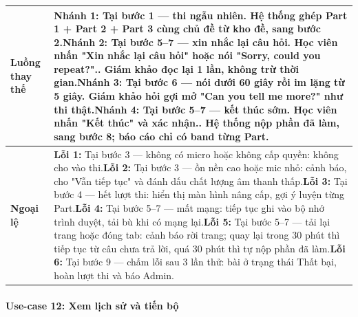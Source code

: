 \begin{longtable}{|p{3.2cm}|p{\dimexpr\linewidth-3.2cm-4\tabcolsep-3\arrayrulewidth\relax}|}
\textbf{Luồng thay thế} & \textbf{Nhánh 1:} Tại bước 1 --- thi ngẫu nhiên\newline 1.1. Hệ thống ghép Part 1 + Part 2 + Part 3 cùng chủ đề từ kho đề, sang bước 2.\newline \textbf{Nhánh 2:} Tại bước 5--7 --- xin nhắc lại câu hỏi\newline 5.1. Học viên nhấn "Xin nhắc lại câu hỏi" hoặc nói "Sorry, could you repeat?".\newline 5.2. Giám khảo đọc lại 1 lần, không trừ thời gian.\newline \textbf{Nhánh 3:} Tại bước 6 --- nói dưới 60 giây rồi im lặng từ 5 giây\newline 6.1. Giám khảo hỏi gợi mở "Can you tell me more?" như thi thật.\newline \textbf{Nhánh 4:} Tại bước 5--7 --- kết thúc sớm\newline 5.1. Học viên nhấn "Kết thúc" và xác nhận.\newline 5.2. Hệ thống nộp phần đã làm, sang bước 8; báo cáo chỉ có band từng Part. \\ \hline
\textbf{Ngoại lệ} & \textbf{Lỗi 1:} Tại bước 3 --- không có micro hoặc không cấp quyền: không cho vào thi.\newline \textbf{Lỗi 2:} Tại bước 3 --- ồn nền cao hoặc mic nhỏ: cảnh báo, cho "Vẫn tiếp tục" và đánh dấu chất lượng âm thanh thấp.\newline \textbf{Lỗi 3:} Tại bước 4 --- hết lượt thi: hiển thị màn hình nâng cấp, gợi ý luyện từng Part.\newline \textbf{Lỗi 4:} Tại bước 5--7 --- mất mạng: tiếp tục ghi vào bộ nhớ trình duyệt, tải bù khi có mạng lại.\newline \textbf{Lỗi 5:} Tại bước 5--7 --- tải lại trang hoặc đóng tab: cảnh báo rời trang; quay lại trong 30 phút thì tiếp tục từ câu chưa trả lời, quá 30 phút thì tự nộp phần đã làm.\newline \textbf{Lỗi 6:} Tại bước 9 --- chấm lỗi sau 3 lần thử: bài ở trạng thái Thất bại, hoàn lượt thi và báo Admin. \\ \hline
\end{longtable}
\endgroup


\paragraph{Use-case 12: Xem lịch sử và tiến bộ}

